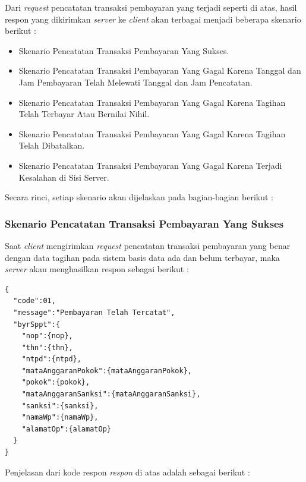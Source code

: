 \documentclass[pdftex,12pt, oneside]{article}
\begin{document}
  Dari \textit{request} pencatatan transaksi pembayaran yang terjadi seperti di atas, hasil respon yang dikirimkan \textit{server} ke \textit{client} akan terbagai menjadi beberapa skenario berikut :
  
  \begin{itemize}
    \item Skenario Pencatatan Transaksi Pembayaran Yang Sukses.
    \item Skenario Pencatatan Transaksi Pembayaran Yang Gagal Karena Tanggal dan Jam Pembayaran Telah Melewati Tanggal dan Jam Pencatatan.
    \item Skenario Pencatatan Transaksi Pembayaran Yang Gagal Karena Tagihan Telah Terbayar Atau Bernilai Nihil.
    \item Skenario Pencatatan Transaksi Pembayaran Yang Gagal Karena Tagihan Telah Dibatalkan.
    \item Skenario Pencatatan Transaksi Pembayaran Yang Gagal Karena Terjadi Kesalahan di Sisi Server.
  \end{itemize}
  
  Secara rinci, setiap skenario akan dijelaskan pada bagian-bagian berikut :
  
  \subsubsection{Skenario Pencatatan Transaksi Pembayaran Yang Sukses}
  
  Saat \textit{client} mengirimkan \textit{request} pencatatan transaksi pembayaran yang benar dengan data tagihan pada sistem basis data ada dan belum terbayar, maka \textit{server} akan menghasilkan respon sebagai berikut :
  
  \begin{lstlisting}
{
  "code":01,
  "message":"Pembayaran Telah Tercatat",
  "byrSppt":{
    "nop":{nop},
    "thn":{thn},
    "ntpd":{ntpd},
    "mataAnggaranPokok":{mataAnggaranPokok},
    "pokok":{pokok},
    "mataAnggaranSanksi":{mataAnggaranSanksi},
    "sanksi":{sanksi},
    "namaWp":{namaWp},
    "alamatOp":{alamatOp}
  }
}
  \end{lstlisting}
  
  Penjelasan dari kode respon \textit{respon} di atas adalah sebagai berikut :
  
\end{document}
